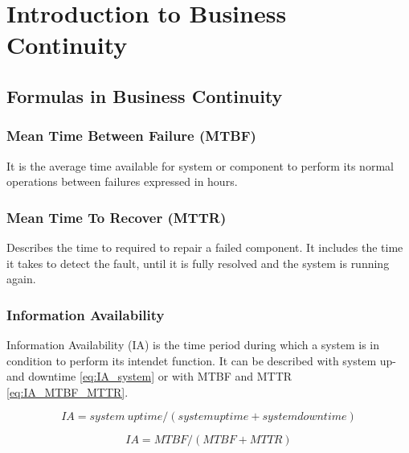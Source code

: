 \section{Introduction to Business Continuity} %
\label{sec:introduction_to_business_continuity}

\subsection{Formulas in Business Continuity} %
\label{sub:formulas_in_business_continuity}

	\subsubsection{Mean Time Between Failure (MTBF)} %
	\label{ssub:mean_time_between_failure}
		It is the average time available for system or component
		to perform its normal operations between failures expressed in hours.

	\subsubsection{Mean Time To Recover (MTTR)} %
	\label{ssub:mean_time_to_recover}
		Describes the time to required to repair a failed component.
		It includes the time it takes to detect the fault,
		until it is fully resolved
		and the system is running again.

	\subsubsection{Information Availability} %
	\label{ssub:availability}
		Information Availability (IA) is the time period during
		which a system is in condition to perform its intendet function.
		It can be described with system up- and downtime \ref{eq:IA_system}
		or with MTBF and MTTR \ref{eq:IA_MTBF_MTTR}.

		\begin{equation}
			IA = system\ uptime/(system uptime + system downtime)
		\end{equation}
		\label{eq:IA_system}

		\begin{equation}
			IA = MTBF/(MTBF + MTTR)
		\end{equation}
		\label{eq:IA_MTBF_MTTR}

